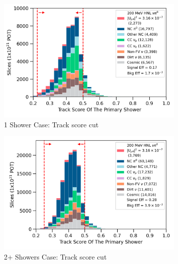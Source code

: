 \begin{figure}[ht!]
        \begin{subfigure}[b]{0.495\textwidth}   
            \centering 
            \includegraphics[width=\textwidth]{one_shw_track_score}
            \caption{1 Shower Case: Track score cut}%
        \end{subfigure}
        \hfill
        \begin{subfigure}[b]{0.495\textwidth}   
            \centering 
            \includegraphics[width=\textwidth]{two_shower_primary_track_score_precut}
            \caption{2+ Showers Case: Track score cut}%
        \end{subfigure}
        \hfill
	\centering
        \begin{subfigure}[b]{0.495\textwidth}   
            \centering 

\end{subfigure}
\end{figure}
